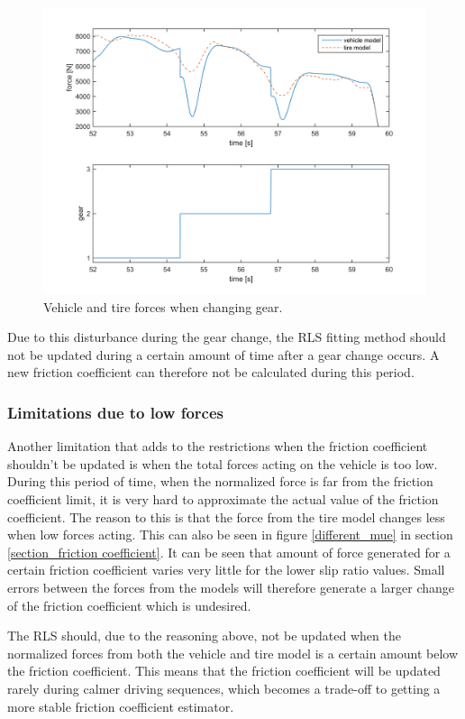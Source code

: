 \begin{figure}[h]
	\centering
	\includegraphics[width=1.0\textwidth]{Pictures/gear_change}
	\caption {Vehicle and tire forces when changing gear.}
	\label{gear_change}
\end{figure}

Due to this disturbance during the gear change, the RLS fitting method should not be updated during a certain amount of time after a gear change occurs. A new friction coefficient can therefore not be calculated during this period. 

\subsubsection{Limitations due to low forces}
Another limitation that adds to the restrictions when the friction coefficient shouldn't be updated is when the total forces acting on the vehicle is too low. During this period of time, when the normalized force is far from the friction coefficient limit, it is very hard to approximate the actual value of the friction coefficient. The reason to this is that the force from the tire model changes less when low forces acting. This can also be seen in figure \ref{different_mue} in section \ref{section_friction coefficient}. It can be seen that amount of force generated for a certain friction coefficient varies very little for the lower slip ratio values. Small errors between the forces from the models will therefore generate a larger change of the friction coefficient which is undesired. 

The RLS should, due to the reasoning above, not be updated when the normalized forces from both the vehicle and tire model is a certain amount below the friction coefficient. This means that the friction coefficient will be updated rarely during calmer driving sequences, which becomes a trade-off to getting a more stable friction coefficient estimator. 


